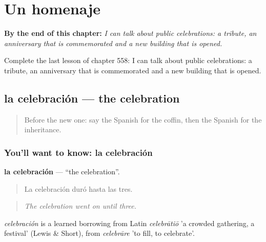 
\chapter{Un homenaje}
\label{ch:es-un-homenaje}

\begin{chapteropening}
\textbf{By the end of this chapter:} \emph{I can talk about public celebrations: a tribute, an anniversary that is commemorated and a new building that is opened.}

Complete the last lesson of chapter 558: I can talk about public celebrations: a tribute, an anniversary that is commemorated and a new building that is opened.
\end{chapteropening}

\section[la celebración]{la celebración — the celebration}

\label{lesson:ES-C558-celebracion}



\begin{quote}
Before the new one: say the Spanish for the coffin, then the Spanish for the inheritance.
\end{quote}

\subsection*{You'll want to know: la celebración}
\textbf{la celebración} — \textquotedblleft{}the celebration\textquotedblright{}.

\begin{quote}
La celebración duró hasta las tres.
\end{quote}

\begin{quote}
\emph{The celebration went on until three.}
\end{quote}

\begin{cousinweb}
\emph{celebración} is a learned borrowing from Latin \emph{celebrātiō} 'a crowded gathering, a festival' (Lewis \& Short), from \emph{celebrāre} 'to fill, to celebrate'.
\end{cousinweb}

